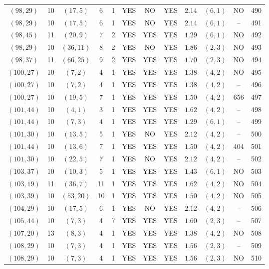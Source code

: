 \begin{longtable}{|c|c|c|c|c|c|c|c|c|c|c|c|}
$(98,29)$ & 10 & $(17,5)$ & 6 & 1 & YES & NO & YES & $2.14$ & $(6,1)$ & NO & 490\\
$(98,29)$ & 10 & $(17,5)$ & 6 & 1 & YES & NO & YES & $2.14$ & $(6,1)$ & -- & 491\\
$(98,45)$ & 11 & $(20,9)$ & 7 & 2 & YES & YES & YES & $1.29$ & $(6,1)$ & NO & 492\\
$(98,29)$ & 10 & $(36,11)$ & 8 & 2 & YES & NO & YES & $1.86$ & $(2,3)$ & NO & 493\\
$(98,37)$ & 11 & $(66,25)$ & 9 & 2 & YES & YES & YES & $1.70$ & $(2,3)$ & NO & 494\\
$(100,27)$ & 10 & $(7,2)$ & 4 & 1 & YES & YES & YES & $1.38$ & $(4,2)$ & NO & 495\\
$(100,27)$ & 10 & $(7,2)$ & 4 & 1 & YES & YES & YES & $1.38$ & $(4,2)$ & -- & 496\\
$(100,27)$ & 10 & $(19,5)$ & 7 & 1 & YES & YES & YES & $1.50$ & $(4,2)$ & 656 & 497\\
$(101,44)$ & 10 & $(4,1)$ & 3 & 1 & YES & YES & YES & $1.62$ & $(4,2)$ & -- & 498\\
$(101,44)$ & 10 & $(7,3)$ & 4 & 1 & YES & YES & YES & $1.29$ & $(6,1)$ & -- & 499\\
$(101,30)$ & 10 & $(13,5)$ & 5 & 1 & YES & NO & YES & $2.12$ & $(4,2)$ & -- & 500\\
$(101,44)$ & 10 & $(13,6)$ & 7 & 1 & YES & YES & YES & $1.50$ & $(4,2)$ & 404 & 501\\
$(101,30)$ & 10 & $(22,5)$ & 7 & 1 & YES & NO & YES & $2.12$ & $(4,2)$ & -- & 502\\
$(103,37)$ & 10 & $(10,3)$ & 5 & 1 & YES & YES & YES & $1.43$ & $(6,1)$ & NO & 503\\
$(103,19)$ & 11 & $(36,7)$ & 11 & 1 & YES & YES & YES & $1.62$ & $(4,2)$ & NO & 504\\
$(103,39)$ & 10 & $(53,20)$ & 10 & 1 & YES & YES & YES & $1.50$ & $(4,2)$ & NO & 505\\
$(104,29)$ & 10 & $(17,5)$ & 6 & 1 & YES & NO & YES & $2.12$ & $(4,2)$ & -- & 506\\
$(105,44)$ & 10 & $(7,3)$ & 4 & 7 & YES & YES & YES & $1.60$ & $(2,3)$ & -- & 507\\
$(107,20)$ & 13 & $(8,3)$ & 4 & 1 & YES & YES & YES & $1.38$ & $(4,2)$ & NO & 508\\
$(108,29)$ & 10 & $(7,3)$ & 4 & 1 & YES & YES & YES & $1.56$ & $(2,3)$ & -- & 509\\
$(108,29)$ & 10 & $(7,3)$ & 4 & 1 & YES & YES & YES & $1.56$ & $(2,3)$ & NO & 510\\

\end{longtable}

